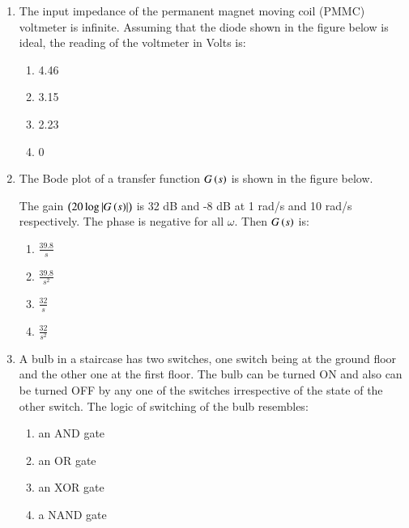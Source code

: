 \documentclass[journal,9pt,onecolumn]{IEEEtran}
\begin{document}
\begin{enumerate}

\item The input impedance of the permanent magnet moving coil (PMMC) voltmeter is infinite. Assuming that the diode shown in the figure below is ideal, the reading of the voltmeter in Volts is:
\begin{center}
    
\end{center}
\begin{multicols}{4}
    \begin{enumerate}
        \item 4.46
        \item 3.15
        \item 2.23
        \item 0
    \end{enumerate}
\end{multicols}

\item The Bode plot of a transfer function $G\left(s\right)$ is shown in the figure below.
\begin{center}
    
\end{center}The gain $\left(20 \log \left\vert G\left(s\right)\right\vert\right)$ is 32 dB and -8 dB at 1 rad/s and 10 rad/s respectively. The phase is negative for all $\omega$. Then $G\left(s\right)$ is:

\begin{multicols}{4}
    \begin{enumerate}
        \item $\frac{39.8}{s}$
        \item $\frac{39.8}{s^2}$
        \item $\frac{32}{s}$
        \item $\frac{32}{s^2}$
    \end{enumerate}
\end{multicols}

\item A bulb in a staircase has two switches, one switch being at the ground floor and the other one at the first floor. The bulb can be turned ON and also can be turned OFF by any one of the switches irrespective of the state of the other switch. The logic of switching of the bulb resembles:

\begin{multicols}{4}
    \begin{enumerate}
        \item an AND gate
        \item an OR gate
        \item an XOR gate
        \item a NAND gate
    \end{enumerate}
\end{multicols}


\end{enumerate}
\end{document}
